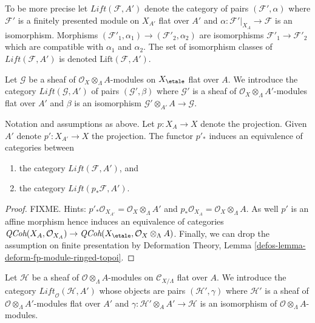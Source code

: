 \medskip\noindent
To be more precise let $\textit{Lift}(\mathcal{F}, A')$ denote the category
of pairs $(\mathcal{F}', \alpha)$ where $\mathcal{F}'$ is a
finitely presented module on $X_{A'}$ flat over $A'$ and
$\alpha : \mathcal{F}'|_{X_A} \to \mathcal{F}$ is an isomorphism.
Morphisms $(\mathcal{F}'_1, \alpha_1) \to (\mathcal{F}'_2, \alpha_2)$
are isomorphisms $\mathcal{F}'_1 \to \mathcal{F}'_2$ which are compatible
with $\alpha_1$ and $\alpha_2$.
The set of isomorphism classes of $\textit{Lift}(\mathcal{F}, A')$
is denoted $\text{Lift}(\mathcal{F}, A')$.

\medskip\noindent
Let $\mathcal{G}$ be a sheaf of $\mathcal{O}_X \otimes_\Lambda A$-modules
on $X_\etale$ flat over $A$. We introduce the category
$\textit{Lift}(\mathcal{G}, A')$ of pairs
$(\mathcal{G}', \beta)$ where $\mathcal{G}'$ is a sheaf of
$\mathcal{O}_X \otimes_\Lambda A'$-modules flat over $A'$ and $\beta$
is an isomorphism $\mathcal{G}' \otimes_{A'} A \to \mathcal{G}$.

\begin{lemma}
\label{lemma-equivalence}
Notation and assumptions as above. Let $p : X_A \to X$ denote the projection.
Given $A'$ denote $p' : X_{A'} \to X$ the projection. The functor $p'_*$
induces an equivalence of categories between
\begin{enumerate}
\item the category $\textit{Lift}(\mathcal{F}, A')$, and
\item the category $\textit{Lift}(p_*\mathcal{F}, A')$.
\end{enumerate}
\end{lemma}

\begin{proof}
FIXME. Hints: $p'_*\mathcal{O}_{X_{A'}} = \mathcal{O}_X \otimes_\Lambda A'$
and $p_*\mathcal{O}_{X_A} = \mathcal{O}_X \otimes_\Lambda A$. As well
$p'$ is an affine morphism hence induces an equivalence of categories
$\textit{QCoh}(X_A, \mathcal{O}_{X_A}) \to
\textit{QCoh}(X_\etale, \mathcal{O}_X \otimes_\Lambda A)$.
Finally, we can drop the assumption on finite presentation by
Deformation Theory, Lemma \ref{defos-lemma-deform-fp-module-ringed-topoi}.
\end{proof}

\noindent
Let $\mathcal{H}$ be a sheaf of $\mathcal{O} \otimes_\Lambda A$-modules
on $\mathcal{C}_{X/\Lambda}$ flat over $A$. We introduce the category
$\textit{Lift}_\mathcal{O}(\mathcal{H}, A')$
whose objects are pairs $(\mathcal{H}', \gamma)$ where $\mathcal{H}'$
is a sheaf of $\mathcal{O} \otimes_\Lambda A'$-modules flat over $A'$
and $\gamma : \mathcal{H}' \otimes_A A' \to \mathcal{H}$
is an isomorphism of $\mathcal{O} \otimes_\Lambda A$-modules.

